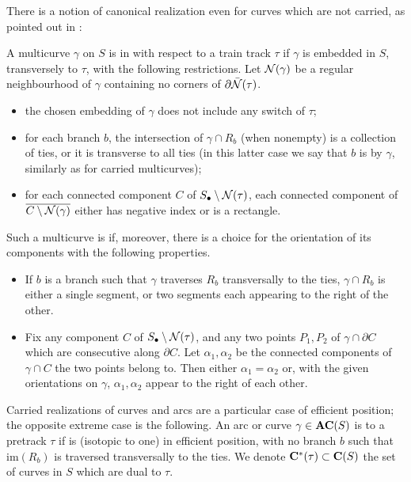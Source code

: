 There is a notion of canonical realization even for curves which are not carried, as pointed out in \cite{mms}:
\begin{defin}\label{def:efficientposition}
A multicurve $\gamma$ on $S$ is in  with respect to a train track $\tau$ if $\gamma$ is embedded in $S$, transversely to $\tau$, with the following restrictions. Let ${\mathcal N}(\gamma)$ be a regular neighbourhood of $\gamma$ containing no corners of $\partial \bar{{\mathcal N}}(\tau)$.
\begin{itemize}
\item the chosen embedding of $\gamma$ does not include any switch of $\tau$;
\item for each branch $b$, the intersection of $\gamma\cap R_b$ (when nonempty) is a collection of ties, or it is transverse to all ties (in this latter case we say that $b$ is  by $\gamma$, similarly as for carried multicurves);
\item for each connected component $C$ of $S_\bullet\setminus{\mathcal N}(\tau)$, each connected component of $\overline{C\setminus{\mathcal N}(\gamma)}$ either has negative index or is a rectangle.
\end{itemize}

Such a multicurve is  if, moreover, there is a choice for the orientation of its components with the following properties.
\begin{itemize}
\item If $b$ is a branch such that $\gamma$ traverses $R_b$ transversally to the ties, $\gamma\cap R_b$ is either a single segment, or two segments each appearing to the right of the other.
\item Fix any component $C$ of $S_\bullet\setminus{\mathcal N}(\tau)$, and any two points $P_1,P_2$ of $\gamma\cap \partial C$ which are consecutive along $\partial C$. Let $\alpha_1,\alpha_2$ be the connected components of $\gamma\cap C$ the two points belong to. Then either $\alpha_1=\alpha_2$ or, with the given orientations on $\gamma$, $\alpha_1,\alpha_2$ appear to the right of each other.
\end{itemize}
\end{defin}

Carried realizations of curves and arcs are a particular case of efficient position; the opposite extreme case is the following. An arc or curve $\gamma\in\mathbf{AC}(S)$ is  to a pretrack $\tau$ if is (isotopic to one) in efficient position, with no branch $b$ such that $\mathrm{im}(R_b)$ is traversed transversally to the ties. We denote $\mathbf C^*(\tau)\subset \mathbf C(S)$ the set of curves in $S$ which are dual to $\tau$.

